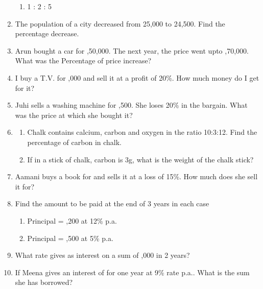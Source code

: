 \begin{enumerate}[label=\thesection.\arabic*,ref=\thesection.\theenumi,resume*]
\begin{enumerate}
		\item  1 : 2 : 5
	\end{enumerate}
\item  The population of a city decreased from 25,000 to 24,500. Find the percentage decrease.
\item  Arun bought a car for ,50,000. The next year, the price went upto ,70,000. What was the Percentage of price increase?
\item  I buy a T.V. for ,000 and sell it at a profit of 20\%. How much money do I get for it?
\item  Juhi sells a washing machine for ,500. She loses 20\% in the bargain. What was the price at which she bought it?
\item 
	\begin{enumerate}
		\item Chalk contains calcium, carbon and oxygen in the ratio 10:3:12. Find the percentage of carbon in chalk.
		\item  If in a stick of chalk, carbon is 3g, what is the weight of the chalk stick?
	\end{enumerate}
\item Aamani buys a book for  and sells it at a loss of 15\%. How much does she sell it for?
\item  Find the amount to be paid at the end of 3 years in each case
	\begin{enumerate}
\item  Principal = ,200 at 12\% p.a.
\item  Principal = ,500 at 5\% p.a.
	\end{enumerate}
\item  What rate gives  as interest on a sum of ,000 in 2 years? 
\item  If Meena gives an interest of  for one year at 9\% rate p.a.. What is the sum she has borrowed?
\end{enumerate}
